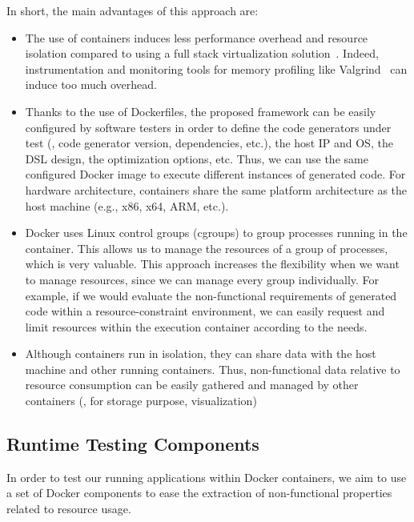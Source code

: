 In short, the main advantages of this approach are:
\begin{itemize}
	\item The use of containers induces less performance overhead and resource isolation compared to using a full stack virtualization solution~\cite{spoiala2016performance}. Indeed, instrumentation and monitoring tools for memory profiling like Valgrind~\cite{nethercote2007valgrind} can induce too much overhead.
	\item Thanks to the use of Dockerfiles, the proposed framework can be easily configured by software testers in order to define the code generators under test (\eg, code generator version, dependencies, etc.), the host IP and OS, the DSL design, the optimization options, etc. Thus, we can use the same configured Docker image to execute different instances of generated code. For hardware architecture, containers share the same platform architecture as the host machine (e.g., x86, x64, ARM, etc.). 
	\item Docker uses Linux control groups (cgroups) to group processes running in the container. This allows us to manage the resources of a group of processes, which is very valuable. 
	This approach increases the flexibility when we want to manage resources, since we can manage every group individually. For example, if we would evaluate the non-functional requirements of generated code within a resource-constraint environment, we can easily request and limit resources within the execution container according to the needs.
	\item Although containers run in isolation, they can share data with the host machine and other running containers. Thus, non-functional data relative to resource consumption can be easily gathered and managed by other containers (\ie, for storage purpose, visualization)
\end{itemize}


\subsection{Runtime Testing Components}
In order to test our running applications within Docker containers, we aim to use a set of Docker components to ease the extraction of non-functional properties related to resource usage.
